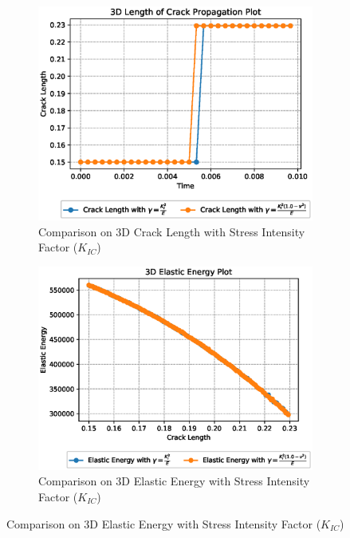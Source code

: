 \documentclass[a4paper,11pt]{article}
\begin{document}
\begin{figure}[h!]
	\begin{subfigure}[b]{0.49\linewidth}
		\centering
		\includegraphics[width=\linewidth]{picture/conference/cracklength_3d_ki}
		\caption{Comparison on 3D Crack Length with Stress Intensity Factor ($K_{IC}$)}
		\label{fig:cracklength3dki}
	\end{subfigure}
	\begin{subfigure}[b]{0.49\linewidth}
		\centering
		\includegraphics[width=\linewidth]{picture/conference/elastic_3d_ki}
		\caption{Comparison on 3D Elastic Energy with Stress Intensity Factor ($K_{IC}$)}
		\label{fig:elastic3dki}
	\end{subfigure}
\end{figure}
\fi
\end{document}
